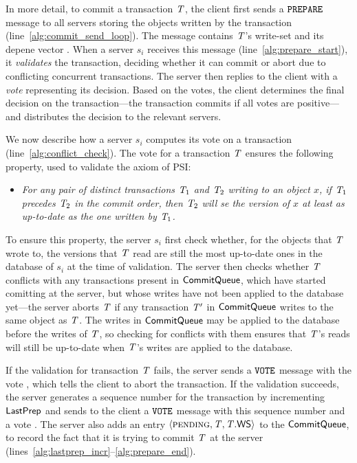 In more detail, to commit a transaction $\mathit{T}$, the client first sends a ${\tt PREPARE}$ message to all servers storing the objects written by the transaction (line~\ref{alg:commit_send_loop}). The message contains $\mathit{T}$'s write-set and its depene vector . When a server $s_i$ receives this message (line~\ref{alg:prepare_start}), it \emph{validates} the transaction, deciding whether it can commit or abort due to conflicting concurrent transactions. The server then replies to the client with a \emph{vote} representing its decision. Based on the votes, the client determines the final decision on the transaction---the transaction commits if all votes are positive---and distributes the decision to the relevant servers.

We now describe how a server $s_i$ computes its vote on a transaction (line~\ref{alg:conflict_check}). The vote for a transaction $\mathit{T}$ ensures the following property, used to validate the \Wconflict axiom of PSI: 

\begin{itemize}
    \item \emph{For any pair of distinct transactions $\mathit{T}_1$ and $\mathit{T}_2$ writing to an object $x$, if $\mathit{T}_1$ precedes $\mathit{T}_2$ in the commit order, then $\mathit{T}_2$ will se the version of $x$ at least as up-to-date as the one written by $\mathit{T}_1$.}
\end{itemize}

To ensure this property, the server $s_i$ first check whether, for the objects that $\mathit{T}$ wrote to, the versions that $\mathit{T}$ read are still the most up-to-date ones in the database of $s_i$ at the time of validation. The server then checks whether $\mathit{T}$ conflicts with any transactions present in $\mathsf{CommitQueue}$, which have started comitting at the server, but whose writes have not been applied to the database yet---the server aborts $\mathit{T}$ if any transaction $\mathit{T}'$ in $\mathsf{CommitQueue}$ writes to the same object as $\mathit{T}$. The writes in $\mathsf{CommitQueue}$ may be applied to the database before the writes of $\mathit{T}$, so checking for conflicts with them ensures that $\mathit{T}$'s reads will still be up-to-date when $\mathit{T}$'s writes are applied to the database.

If the validation for transaction $\mathit{T}$ fails, the server sends a ${\tt VOTE}$ message with the vote \abort, which tells the client to abort the transaction. If the validation succeeds, the server generates a sequence number for the transaction by incrementing $\mathsf{LastPrep}$ and sends to the client a ${\tt VOTE}$ message with this sequence number and a vote \commit. The server also adds an entry $\langle \text{\sc pending}, \mathit{T}, \mathit{T}.\mathsf{WS} \rangle$ to the $\mathsf{CommitQueue}$, to record the fact that it is trying to commit $\mathit{T}$ at the server (lines~\ref{alg:lastprep_incr}--\ref{alg:prepare_end}).

